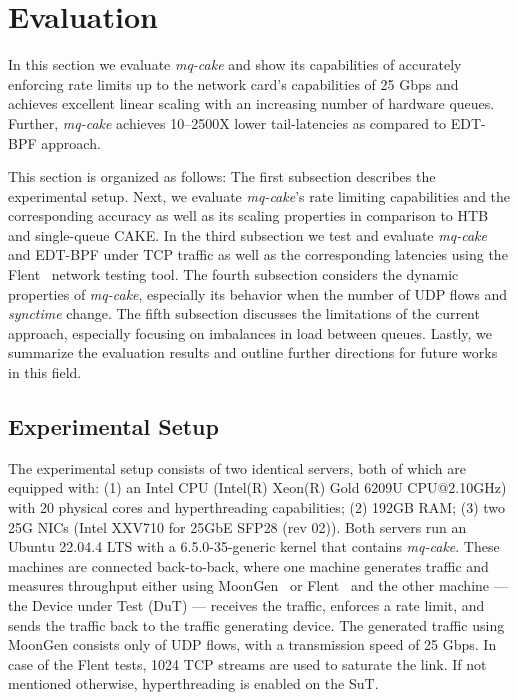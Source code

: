 \section{Evaluation}\label{sec:evaluation}
In this section we evaluate \textit{mq-cake} and show its capabilities of accurately enforcing rate limits up to the network card's capabilities of 25 Gbps and achieves excellent linear scaling with an increasing number of hardware queues.
%
Further, \textit{mq-cake} achieves 10--2500X lower tail-latencies as compared to EDT-BPF approach.

This section is organized as follows:
%
The first subsection describes the experimental setup. 
%
Next, we evaluate \textit{mq-cake}'s rate limiting capabilities and the corresponding accuracy as well as its scaling properties in comparison to HTB and single-queue CAKE.
%
In the third subsection we test and evaluate \textit{mq-cake} and EDT-BPF under TCP traffic as well as the corresponding latencies using the Flent~\cite{flent} network testing tool.
%
The fourth subsection considers the dynamic properties of \textit{mq-cake}, especially its behavior when the number of UDP flows and \textit{synctime} change.
%
The fifth subsection discusses the limitations of the current approach, especially focusing on imbalances in load between queues.
%
Lastly, we summarize the evaluation results and outline further directions for future works in this field.

\subsection{Experimental Setup}
The experimental setup consists of two identical servers, both of which are equipped with: 
(1) an Intel CPU (Intel(R) Xeon(R) Gold 6209U CPU@2.10GHz) with 20 physical cores and hyperthreading capabilities;
(2) 192GB RAM;
(3) two 25G NICs (Intel XXV710 for 25GbE SFP28 (rev 02)).
Both servers run an Ubuntu 22.04.4 LTS with a 6.5.0-35-generic kernel that contains \textit{mq-cake}. 
These machines are connected back-to-back, where one machine generates traffic and measures throughput either using MoonGen~\cite{moongen} or Flent~\cite{flent} and the other machine --- the Device under Test (DuT) --- receives the traffic, enforces a rate limit, and sends the traffic back to the traffic generating device.
%
The generated traffic using MoonGen consists only of UDP flows, with a transmission speed of 25 Gbps.
%
In case of the Flent tests, 1024 TCP streams are used to saturate the link.
%
If not mentioned otherwise, hyperthreading is enabled on the SuT.

